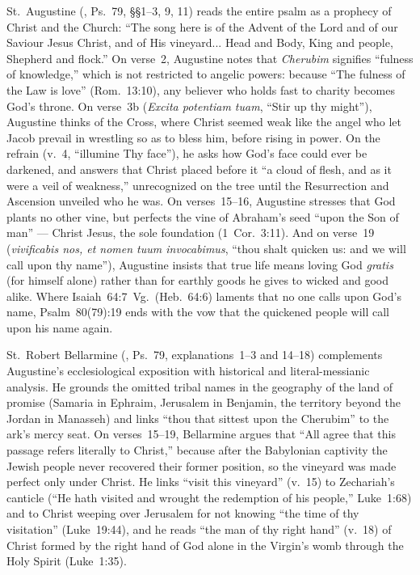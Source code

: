 St.~Augustine (, Ps.~79, §§1--3, 9, 11) reads the entire psalm as a prophecy of Christ and the Church: ``The song here is of the Advent of the Lord and of our Saviour Jesus Christ, and of His vineyard... Head and Body, King and people, Shepherd and flock.'' On verse~2, Augustine notes that \emph{Cherubim} signifies ``fulness of knowledge,'' which is not restricted to angelic powers: because ``The fulness of the Law is love'' (Rom.~13:10), any believer who holds fast to charity becomes God's throne. On verse~3b (\emph{Excita potentiam tuam}, ``Stir up thy might''), Augustine thinks of the Cross, where Christ seemed weak like the angel who let Jacob prevail in wrestling so as to bless him, before rising in power. On the refrain (v.~4, ``illumine Thy face''), he asks how God's face could ever be darkened, and answers that Christ placed before it ``a cloud of flesh, and as it were a veil of weakness,'' unrecognized on the tree until the Resurrection and Ascension unveiled who he was. On verses~15--16, Augustine stresses that God plants no other vine, but perfects the vine of Abraham's seed ``upon the Son of man'' --- Christ Jesus, the sole foundation (1~Cor.~3:11). And on verse~19 (\emph{vivificabis nos, et nomen tuum invocabimus}, ``thou shalt quicken us: and we will call upon thy name''), Augustine insists that true life means loving God \emph{gratis} (for himself alone) rather than for earthly goods he gives to wicked and good alike. Where Isaiah~64:7~Vg.\ (Heb.~64:6) laments that no one calls upon God's name, Psalm~80(79):19 ends with the vow that the quickened people will call upon his name again.

St.~Robert Bellarmine (, Ps.~79, explanations~1--3 and 14--18) complements Augustine's ecclesiological exposition with historical and literal-messianic analysis. He grounds the omitted tribal names in the geography of the land of promise (Samaria in Ephraim, Jerusalem in Benjamin, the territory beyond the Jordan in Manasseh) and links ``thou that sittest upon the Cherubim'' to the ark's mercy seat. On verses~15--19, Bellarmine argues that ``All agree that this passage refers literally to Christ,'' because after the Babylonian captivity the Jewish people never recovered their former position, so the vineyard was made perfect only under Christ. He links ``visit this vineyard'' (v.~15) to Zechariah's canticle (``He hath visited and wrought the redemption of his people,'' Luke~1:68) and to Christ weeping over Jerusalem for not knowing ``the time of thy visitation'' (Luke~19:44), and he reads ``the man of thy right hand'' (v.~18) of Christ formed by the right hand of God alone in the Virgin's womb through the Holy Spirit (Luke~1:35).

